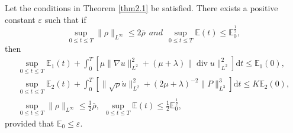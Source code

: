 \documentclass[10pt,a4paper]{amsart}
\DeclareMathOperator{\divv}{div}
\begin{document}
\begin{Proposition}\label{pro4.1}
Let the conditions in Theorem \ref{thm2.1} be satisfied.
There exists a positive constant $\varepsilon$ such that if
\begin{equation}\label{4.1}
\sup_{0 \leq t \leq T}\|\rho \|_{L^\infty } \leq 2 \bar \rho \ \ and \ \ \sup_{0 \leq t \leq T} \mathbb{E} (t) \leq \mathbb{E}_0^{\frac{1}{2}},
\end{equation}
then
\begin{gather}\label{4.3}
\sup_{0 \leq t \leq T} \mathbb{E}_1 (t) + \int^T_0 \left[ \mu \|\nabla u\|_{L^2}^2 + (\mu + \lambda ) \|\divv u\|_{L^2}^2 \right] \mathrm{d} t \leq \mathbb{E}_1 (0),
\\ \label{4.4}
\sup_{0 \leq t \leq T} \mathbb{E}_2 (t) + \int^T_0 \left[\|\sqrt{\rho} \dot{u}\|_{L^2}^2 + (2 \mu + \lambda )^{-2} \|P\|_{L^3}^3 \right] \mathrm{d} t \leq K \mathbb{E}_2 (0),\\
\label{4.2}
\sup_{0 \leq t \leq T}\|\rho \|_{L^\infty } \leq \frac{3}{2} \bar \rho, \ \ \sup_{0 \leq t \leq T}\mathbb{E} (t) \leq \frac{1}{2} \mathbb{E}_0^{\frac{1}{2}},
\end{gather}
provided that $\mathbb{E}_0 \leq \varepsilon.$
\end{Proposition}
\end{document}
